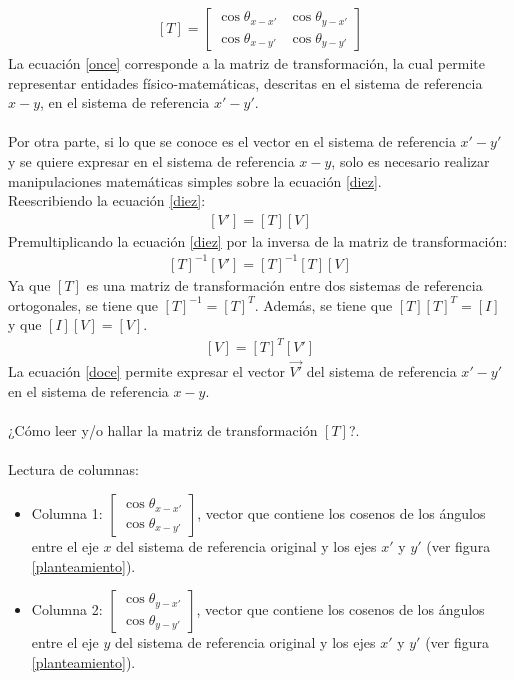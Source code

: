 \documentclass[12pt,letterpaper, twoside, openany]{article}
\begin{document}
%
\begin{align}
	\left[ T \right] = \left[ \begin{array}{cc}
		\cos \theta_{x-x'} & \cos \theta_{y-x'} \\
		\cos \theta_{x-y'} & \cos \theta_{y-y'}	
	\end{array} \right] \label{once}
\end{align}
%
La  ecuación \ref{once} corresponde a la matriz de transformación, la cual permite representar entidades físico-matemáticas, descritas en el sistema de referencia $x-y$, en el sistema de referencia $x'-y'$.\\\\

Por otra parte, si lo que se conoce es el vector en el sistema de referencia $x'-y'$ y se quiere  expresar en el sistema de referencia $x-y$, solo es necesario realizar manipulaciones matemáticas simples sobre la ecuación \ref{diez}.\\
%
Reescribiendo la ecuación \ref{diez}:
%
\begin{align*}
	\left[ V' \right] = \left[ T \right] \left[ V \right]
\end{align*}
%
Premultiplicando la ecuación \ref{diez} por la inversa de la matriz de transformación:
%
\begin{align*}
	\left[ T \right]^{-1} \left[ V' \right] = \left[ T \right]^{-1} \left[ T \right] \left[ V \right]
\end{align*}
%
Ya que $\left[ T \right]$ es una matriz de transformación entre dos sistemas de referencia ortogonales, se tiene que $\left[ T \right]^{-1} = \left[ T \right]^T$. Además, se tiene que $\left[ T \right] \left[ T \right]^T = \left[ I \right]$ y que $\left[ I \right] \left[ V \right] = \left[ V \right]$.
%
\begin{align}
	\left[ V \right] = \left[ T \right]^T \left[ V' \right] \label{doce}
\end{align}
%
La ecuación \ref{doce} permite expresar el vector $\overset{\rightarrow}{V'}$ del sistema de referencia $x'-y'$ en el sistema de referencia $x-y$.\\\\
%
¿Cómo leer y/o hallar la matriz de transformación $\left[ T \right]$?.\\\\
Lectura de columnas:
%
\begin{itemize}
	\item Columna 1: $ \left[ \begin{array}{c}
		\cos \theta_{x-x'} \\	 \cos \theta_{x-y'}
	\end{array} \right]$, vector que contiene los cosenos de los ángulos entre el eje $x$ del sistema de referencia original y los ejes $x'$ y $y'$ (ver figura \ref{planteamiento}).
	\item Columna 2: $ \left[ \begin{array}{c}
		\cos \theta_{y-x'} \\	 \cos \theta_{y-y'}
	\end{array} \right]$, vector que contiene los cosenos de los ángulos entre el eje $y$ del sistema de referencia original y los ejes $x'$ y $y'$ (ver figura \ref{planteamiento}).
\end{itemize}
\end{document}

